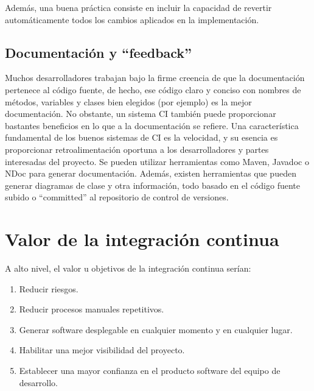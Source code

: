Además, una buena práctica consiste en incluir la capacidad de revertir automáticamente todos los cambios aplicados en la implementación.

\subsection{Documentación y “feedback”}
Muchos desarrolladores trabajan bajo la firme creencia de que la documentación pertenece al código fuente, de hecho, ese código claro y conciso con nombres de métodos, variables y clases bien elegidos (por ejemplo) es la mejor documentación. No obstante, un sistema CI también puede proporcionar bastantes beneficios en lo que a la documentación se refiere. Una característica fundamental de los buenos sistemas de CI es la velocidad, y su esencia es proporcionar retroalimentación oportuna a los desarrolladores y partes interesadas del proyecto. Se pueden utilizar herramientas como Maven, Javadoc o NDoc para generar documentación. Además, existen herramientas que pueden generar diagramas de clase y otra información, todo basado en el código fuente subido o “committed” al repositorio de control de versiones.

\section{Valor de la integración continua}
A alto nivel, el valor u objetivos de la integración continua serían:
\begin{enumerate}
    \item Reducir riesgos.
    \item Reducir procesos manuales repetitivos.
    \item Generar software desplegable en cualquier momento y en cualquier lugar.
    \item Habilitar una mejor visibilidad del proyecto.
    \item Establecer una mayor confianza en el producto software del equipo de desarrollo.
\end{enumerate}
